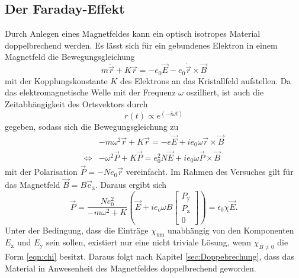 \subsection{Der Faraday-Effekt}
Durch Anlegen eines Magnetfeldes kann ein optisch isotropes Material doppelbrechend werden. Es lässt sich für ein gebundenes Elektron in einem 
Magnetfeld die Bewegungsgleichung
\begin{equation*}
    m\ddot{\vec{r}}+K\vec{r}=-e_0\vec{E}-e_0\dot{\vec{r}}\times\vec{B}
\end{equation*}
mit der Kopplungskonstante $K$ des Elektrons an das Kristallfeld aufstellen. 
Da das elektromagnetische Welle mit der Frequenz $\omega$ oszilliert, ist auch die Zeitabhängigkeit des Ortsvektors durch 
\begin{equation*}
    r(t)\propto e^(-i\omega t)
\end{equation*}
gegeben, sodass sich die Bewegungsgleichung zu 
\begin{align*}
    &-m\omega^2\vec{r}+K\vec{r}=-e\vec{E}+ie_0\omega\vec{r}\times\vec{B}\\
    \Leftrightarrow &-\omega^2\vec{P}+K\vec{P}=e_0^2N\vec{E}+ie_0\omega\vec{P}\times\vec{B}
\end{align*}
mit der Polarisation $\vec{P}= -Ne_0\vec{r}$ vereinfacht. Im Rahmen des Versuches gilt für das Magnetfeld $\vec{B}=B\vec{\text{e}}_\text{z}$. 
Daraus ergibt sich
\begin{equation*}
    \vec{P}=\frac{Ne_0^2}{-m\omega^2+K}\left(\vec{E}+ie_o\omega B
    \left[
    \begin{array}{c}
        P_\text{y}\\
        P_\text{x}\\
        0
    \end{array}
    \right]\right)
    =\epsilon_0\chi\vec{E} .
\end{equation*}
Unter der Bedingung, dass die Einträge $\chi_\text{nm}$ unabhängig von den Komponenten $E_\text{x}$ und $E_\text{y}$ sein sollen, existiert nur eine 
nicht triviale Lösung, wenn $\chi_{B\neq 0}$ die Form \ref{eqn:chi} besitzt. Daraus folgt nach Kapitel \ref{sec:Doppebrechung}, dass das Material in 
Anwesenheit des Magnetfeldes doppelbrechend geworden.

